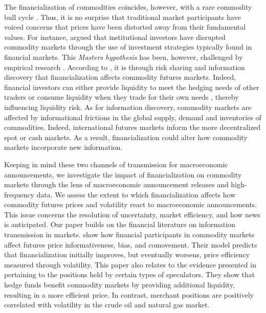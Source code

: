 \documentclass[12pt]{article}
\begin{document}
The financialization of commodities coincides, however, with a rare commodity bull cycle \cite{humphreys2010great}. Thus, it is no surprise that traditional market participants have voiced concerns that prices have been distorted  away from their fundamental values. For instance, \citet{masters2009testimony} argued  that institutional investors have disrupted commodity markets through the use of investment strategies typically found in financial markets. This \emph{Masters hypothesis} has been, however, challenged by empirical research \citep{irwin2011index,irwin2012testing,irwin2012financialization}. According to \citet{cheng2014financialization}, it is through risk sharing and information discovery that financialization affects commodity futures markets. Indeed, financial investors can either provide liquidity to meet the hedging needs of other traders or consume liquidity when they trade for their own needs \citep{kang2020tale} , thereby influencing liquidity risk. As for information discovery, commodity markets are affected by informational frictions in the global supply, demand and inventories of commodities. Indeed, international futures markets inform the more decentralized spot or cash markets. As a result, financialization could alter how commodity markets incorporate new information.

Keeping in mind these two channels of transmission for macroeconomic announcements, we investigate the impact of financialization on commodity markets through the lens of macroeconomic announcement releases and high-frequency data. We assess the extent to which financialization  affects how commodity futures prices and volatility react to macroeconomic announcements. This issue concerns the  resolution of uncertainty, market efficiency, and how news is anticipated. Our paper builds on the financial literature on  information transmission in markets. \citet{goldstein2019commodity} show how financial participants in commodity markets affect futures price informativeness, bias, and comovement. Their model predicts that financialization initially improves, but eventually worsens, price efficiency measured through volatility. This paper also relates to the evidence presented in \citet{brunetti2016speculators} pertaining to the positions held by certain types of speculators. They show that hedge funds benefit commodity markets by providing additional liquidity, resulting in a more efficient price. In contrast, merchant positions are positively correlated with volatility in the crude oil and natural gas market. 
\end{document}
